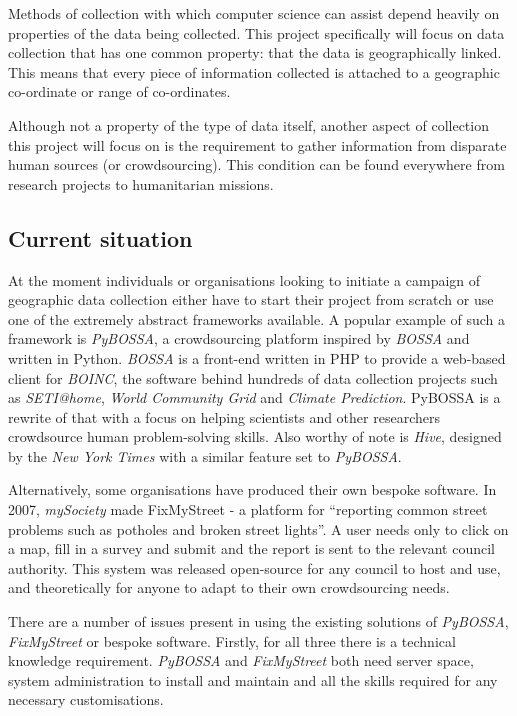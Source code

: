 \documentclass{article}
\begin{document}
		Methods of collection with which computer science can assist depend heavily on properties of the data being collected. This project specifically will focus on data collection that has one common property: that the data is geographically linked. This means that every piece of information collected is attached to a geographic co-ordinate or range of co-ordinates.

		Although not a property of the type of data itself, another aspect of collection this project will focus on is the requirement to gather information from disparate human sources (or crowdsourcing). This condition can be found everywhere from research projects to humanitarian missions.

		\subsection{Current situation}
		At the moment individuals or organisations looking to initiate a campaign of geographic data collection either have to start their project from scratch or use one of the extremely abstract frameworks available. A popular example of such a framework is \emph{PyBOSSA}\cite{_welcome_????}, a crowdsourcing platform inspired by \emph{BOSSA}\cite{_welcome_????} and written in Python. \emph{BOSSA} is a front-end written in PHP to provide a web-based client for \emph{BOINC}, the software behind hundreds of data collection projects such as \emph{SETI@home}, \emph{World Community Grid} and \emph{Climate Prediction}\cite{_boinc_2015}. PyBOSSA is a rewrite of that with a focus on helping scientists and other researchers crowdsource human problem-solving skills\cite{_welcome_????}. Also worthy of note is \emph{Hive}, designed by the \emph{New York Times} with a similar feature set to \emph{PyBOSSA}\cite{_nytlabs/hive_????}.

		Alternatively, some organisations have produced their own bespoke software. In 2007, \emph{mySociety} made FixMyStreet - a platform for ``reporting common street problems such as potholes and broken street lights''\cite{_mysociety/fixmystreet_2015}. A user needs only to click on a map, fill in a survey and submit and the report is sent to the relevant council authority. This system was released open-source for any council to host and use, and theoretically for anyone to adapt to their own crowdsourcing needs.

		There are a number of issues present in using the existing solutions of \emph{PyBOSSA}, \emph{FixMyStreet} or bespoke software. Firstly, for all three there is a technical knowledge requirement. \emph{PyBOSSA} and \emph{FixMyStreet} both need server space, system administration to install and maintain and all the skills required for any necessary customisations.
\end{document}
